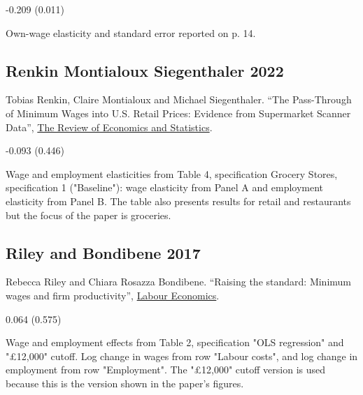  -0.209 (0.011)

\vspace{0.7em}

 Own-wage elasticity and standard error reported on p. 14.

\subsection*{Renkin Montialoux Siegenthaler 2022}
\vspace{-0.7em}

\noindent Tobias Renkin, Claire Montialoux and Michael Siegenthaler. ``The Pass-Through of Minimum Wages into U.S. Retail Prices: Evidence from Supermarket Scanner Data'', \href{https://doi.org/10.1162/rest_a_00981}{The Review of Economics and Statistics}.

\vspace{0.7em}

 -0.093 (0.446)

\vspace{0.7em}

 Wage and employment elasticities from Table 4, specification Grocery Stores, specification 1 ("Baseline"): wage elasticity from Panel A and employment elasticity from Panel B. The table also presents results for retail and restaurants but the focus of the paper is groceries.

\subsection*{Riley and Bondibene 2017}
\vspace{-0.7em}

\noindent Rebecca Riley and Chiara Rosazza Bondibene. ``Raising the standard: Minimum wages and ﬁrm productivity'', \href{http://dx.doi.org/10.1016/j.labeco.2016.11.010}{Labour Economics}.

\vspace{0.7em}

 0.064 (0.575)

\vspace{0.7em}

 Wage and employment effects from Table 2, specification "OLS regression" and "£12,000" cutoff. Log change in wages from row "Labour costs", and log change in employment from row "Employment". The "£12,000" cutoff version is used because this is the version shown in the paper's figures.

